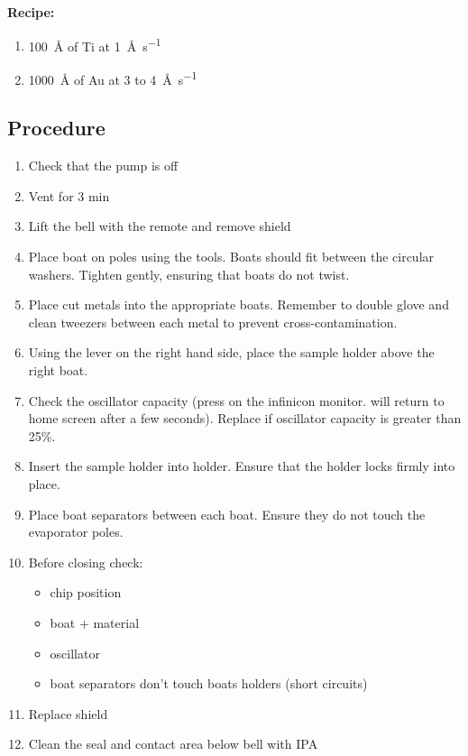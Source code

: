 \textbf{Recipe: }
\begin{enumerate}[label=\protect\nth{\value*} layer: ,noitemsep,leftmargin=10em]
\item \SI{100}{\angstrom} of Ti at \SI{1}{\angstrom\per\second}
\item \SI{1000}{\angstrom} of Au at 3 to \SI{4}{\angstrom\per\second}
\end{enumerate}

\newpage


\subsection{Procedure}
\begin{enumerate}
\item Check that the pump is off
\item Vent for 3 min
\item Lift the bell with the remote and remove shield
\item Place boat on poles using the tools. Boats should fit between the circular washers. Tighten gently, ensuring that
boats do not twist.
\item Place cut metals into the appropriate boats. Remember to double glove and clean tweezers between each metal
to prevent cross-contamination.
\item Using the lever on the right hand side, place the sample holder above the right boat.
\item Check the oscillator capacity (press  on the infinicon monitor. will return to home screen after a few seconds). Replace if
oscillator capacity is greater than 25\%.
\item Insert the sample holder into holder. Ensure that the holder locks firmly into place.
\item Place boat separators between each boat. Ensure they do not touch the evaporator poles.
\item Before closing check:
\begin{itemize}[nolistsep,noitemsep]
  \item chip position
  \item boat + material
  \item oscillator
  \item boat separators don't touch boats holders (short circuits)
\end{itemize}
\item Replace shield
\item Clean the seal and contact area below bell with IPA

\end{enumerate}
